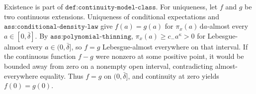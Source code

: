 Existence is part of \(\texttt{def:continuity-model-class}\).  For uniqueness, let \(f\) and \(g\) be two continuous extensions.  Uniqueness of conditional expectations and \(\texttt{ass:conditional-density-law}\) give \(f(a)=g(a)\) for \(\pi_x(a)\,\mathrm da\)-almost every \(a\in[0,\bar\delta]\).  By \(\texttt{ass:polynomial-thinning}\), \(\pi_x(a)\geq c_-a^\kappa>0\) for Lebesgue-almost every \(a\in(0,\bar\delta]\), so \(f=g\) Lebesgue-almost everywhere on that interval.  If the continuous function \(f-g\) were nonzero at some positive point, it would be bounded away from zero on a nonempty open interval, contradicting almost-everywhere equality.  Thus \(f=g\) on \((0,\bar\delta]\), and continuity at zero yields \(f(0)=g(0)\).